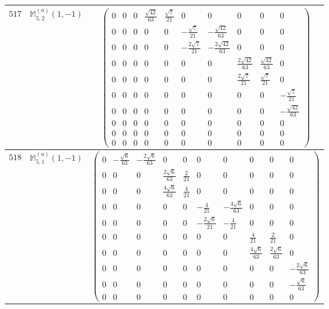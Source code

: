 \documentclass[fleqn,8pt,landscape]{jsarticle}
\begin{document}
\begin{center}
\begin{longtable}{ccc}
$ 517 $ & $ \mathbb{M}_{5,2}^{(a)}(1,-1) $ & $ \begin{pmatrix} 0 & 0 & 0 & \frac{\sqrt{42}}{63} & \frac{\sqrt{7}}{21} & 0 & 0 & 0 & 0 & 0 \\ 0 & 0 & 0 & 0 & 0 & - \frac{\sqrt{7}}{21} & - \frac{\sqrt{42}}{63} & 0 & 0 & 0 \\ 0 & 0 & 0 & 0 & 0 & - \frac{2 \sqrt{7}}{21} & - \frac{2 \sqrt{42}}{63} & 0 & 0 & 0 \\ 0 & 0 & 0 & 0 & 0 & 0 & 0 & \frac{2 \sqrt{42}}{63} & \frac{\sqrt{42}}{63} & 0 \\ 0 & 0 & 0 & 0 & 0 & 0 & 0 & \frac{2 \sqrt{7}}{21} & \frac{\sqrt{7}}{21} & 0 \\ 0 & 0 & 0 & 0 & 0 & 0 & 0 & 0 & 0 & - \frac{\sqrt{7}}{21} \\ 0 & 0 & 0 & 0 & 0 & 0 & 0 & 0 & 0 & - \frac{\sqrt{42}}{63} \\ 0 & 0 & 0 & 0 & 0 & 0 & 0 & 0 & 0 & 0 \\ 0 & 0 & 0 & 0 & 0 & 0 & 0 & 0 & 0 & 0 \\ 0 & 0 & 0 & 0 & 0 & 0 & 0 & 0 & 0 & 0 \end{pmatrix} $ \\ \hline
$ 518 $ & $ \mathbb{M}_{5,1}^{(a)}(1,-1) $ & $ \begin{pmatrix} 0 & - \frac{\sqrt{6}}{63} & - \frac{2 \sqrt{6}}{63} & 0 & 0 & 0 & 0 & 0 & 0 & 0 \\ 0 & 0 & 0 & \frac{2 \sqrt{6}}{63} & \frac{2}{21} & 0 & 0 & 0 & 0 & 0 \\ 0 & 0 & 0 & \frac{4 \sqrt{6}}{63} & \frac{4}{21} & 0 & 0 & 0 & 0 & 0 \\ 0 & 0 & 0 & 0 & 0 & - \frac{4}{21} & - \frac{4 \sqrt{6}}{63} & 0 & 0 & 0 \\ 0 & 0 & 0 & 0 & 0 & - \frac{2 \sqrt{6}}{21} & - \frac{4}{21} & 0 & 0 & 0 \\ 0 & 0 & 0 & 0 & 0 & 0 & 0 & \frac{4}{21} & \frac{2}{21} & 0 \\ 0 & 0 & 0 & 0 & 0 & 0 & 0 & \frac{4 \sqrt{6}}{63} & \frac{2 \sqrt{6}}{63} & 0 \\ 0 & 0 & 0 & 0 & 0 & 0 & 0 & 0 & 0 & - \frac{2 \sqrt{6}}{63} \\ 0 & 0 & 0 & 0 & 0 & 0 & 0 & 0 & 0 & - \frac{\sqrt{6}}{63} \\ 0 & 0 & 0 & 0 & 0 & 0 & 0 & 0 & 0 & 0 \end{pmatrix} $ \\ \hline

\end{longtable}
\end{center}
\end{document}
